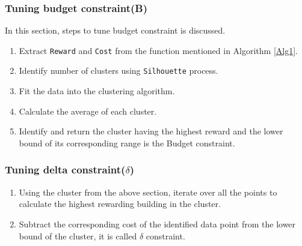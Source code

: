 \subsubsection{Tuning budget constraint(B)}
In this section, steps to tune budget constraint is discussed. 
\begin{enumerate}
    \item Extract \texttt{Reward} and \texttt{Cost} from the function mentioned in Algorithm \ref{Alg1}.
    \item Identify number of clusters using \texttt{Silhouette} process.
    \item Fit the data into the clustering algorithm.
    \item Calculate the average of each cluster.
    \item Identify and return the cluster having the highest reward and the lower bound of its corresponding range is the Budget constraint.
\end{enumerate}

\subsubsection{Tuning delta constraint($\delta$)}
\begin{enumerate}
    \item Using the cluster from the above section, iterate over all the points to calculate the highest rewarding building in the cluster.
    \item Subtract the corresponding cost of the identified data point from the lower bound of the cluster, it is called $\delta$ constraint.
\end{enumerate}